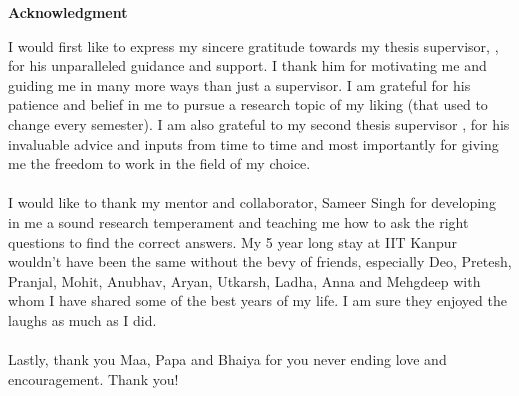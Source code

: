 \begin{center}
	{\huge{\textbf{Acknowledgment}}}
\end{center}
I would first like to express my sincere gratitude towards my thesis supervisor, {\advisormain}, for his unparalleled guidance and support. I thank him for motivating me and guiding me in many more ways than just a supervisor. I am grateful for his patience and belief in me to pursue a research topic of my liking (that used to change every semester). I am also grateful to my second thesis supervisor {\advisorsec}, for his invaluable advice and inputs from time to time and most importantly for giving me the freedom to work in the field of my choice.

\paragraph*{}
I would like to thank my mentor and collaborator, Sameer Singh for developing in me a sound research temperament and teaching me how to ask the right questions to find the correct answers. 
My 5 year long stay at IIT Kanpur wouldn't have been the same without the bevy of friends, especially Deo, Pretesh, Pranjal, Mohit, Anubhav, Aryan, Utkarsh, Ladha, Anna and Mehgdeep with whom I have shared some of the best years of my life. I am sure they enjoyed the laughs as much as I did.

\paragraph*{}
Lastly, thank you Maa, Papa and Bhaiya for you never ending love and encouragement. Thank you!

\vskip 4mm
\begin{flushright}
\textit{\textbf{\author}}
\end{flushright}




